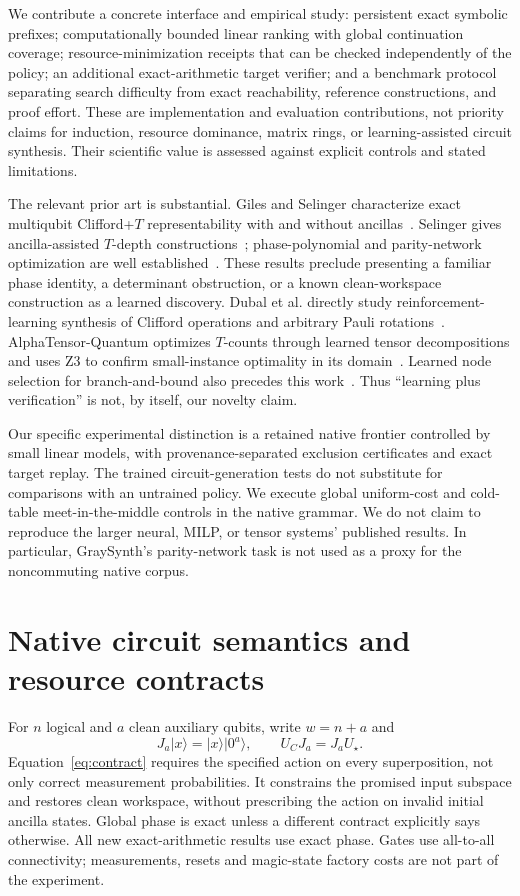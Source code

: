 \documentclass[11pt]{article}
\newcommand{\ket}[1]{\lvert #1\rangle}
\begin{document}
We contribute a concrete interface and empirical study: persistent exact symbolic prefixes; computationally bounded linear ranking with global continuation coverage; resource-minimization receipts that can be checked independently of the policy; an additional exact-arithmetic target verifier; and a benchmark protocol separating search difficulty from exact reachability, reference constructions, and proof effort. These are implementation and evaluation contributions, not priority claims for induction, resource dominance, matrix rings, or learning-assisted circuit synthesis. Their scientific value is assessed against explicit controls and stated limitations.

The relevant prior art is substantial. Giles and Selinger characterize exact multiqubit Clifford+$T$ representability with and without ancillas~\cite{giles}. Selinger gives ancilla-assisted $T$-depth constructions~\cite{selinger}; phase-polynomial and parity-network optimization are well established~\cite{amy}. These results preclude presenting a familiar phase identity, a determinant obstruction, or a known clean-workspace construction as a learned discovery. Dubal et al. directly study reinforcement-learning synthesis of Clifford operations and arbitrary Pauli rotations~\cite{dubal}. AlphaTensor-Quantum optimizes $T$-counts through learned tensor decompositions and uses Z3 to confirm small-instance optimality in its domain~\cite{ruiz}. Learned node selection for branch-and-bound also precedes this work~\cite{mattick}. Thus ``learning plus verification'' is not, by itself, our novelty claim.

Our specific experimental distinction is a retained native frontier controlled by small linear models, with provenance-separated exclusion certificates and exact target replay. The trained circuit-generation tests do not substitute for comparisons with an untrained policy. We execute global uniform-cost and cold-table meet-in-the-middle controls in the native grammar. We do not claim to reproduce the larger neural, MILP, or tensor systems' published results. In particular, GraySynth's parity-network task is not used as a proxy for the noncommuting native corpus.

\section{Native circuit semantics and resource contracts}
For $n$ logical and $a$ clean auxiliary qubits, write $w=n+a$ and
\begin{equation}
 J_a\ket{x}=\ket{x}\ket{0^a},\qquad U_CJ_a=J_aU_\star.
 \label{eq:contract}
\end{equation}
Equation~\eqref{eq:contract} requires the specified action on every superposition, not only correct measurement probabilities. It constrains the promised input subspace and restores clean workspace, without prescribing the action on invalid initial ancilla states. Global phase is exact unless a different contract explicitly says otherwise. All new exact-arithmetic results use exact phase. Gates use all-to-all connectivity; measurements, resets and magic-state factory costs are not part of the experiment.
\end{document}
